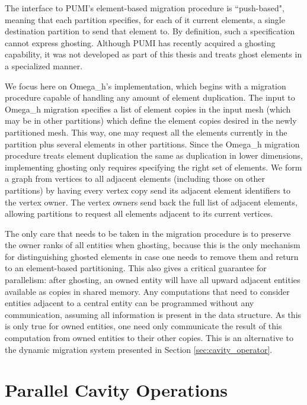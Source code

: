 The interface to PUMI's element-based migration procedure is
``push-based", meaning that each partition specifies, for each
of it current elements, a single destination partition to send
that element to.
By definition, such a specification cannot express ghosting.
Although PUMI has recently acquired a ghosting capability, it was
not developed as part of this thesis and treats ghost elements
in a specialized manner.

We focus here on Omega\_h's implementation, which begins with
a migration procedure capable of handling any amount of element duplication.
The input to Omega\_h migration specifies a list of element copies
in the input mesh (which may be in other partitions) which define
the element copies desired in the newly partitioned mesh.
This way, one may request all the elements currently in the
partition plus several elements in other partitions.
Since the Omega\_h migration procedure treats element duplication
the same as duplication in lower dimensions, implementing ghosting
only requires specifying the right set of elements.
We form a graph from vertices to all adjacent elements (including
those on other partitions) by having every vertex copy send its
adjacent element identifiers to the vertex owner.
The vertex owners send back the full list of adjacent elements,
allowing partitions to request all elements adjacent to its current
vertices.

The only care that needs to be taken in the migration procedure
is to preserve the owner ranks of all entities when ghosting,
because this is the only mechanism for distinguishing ghosted
elements in case one needs to remove them and return to
an element-based partitioning.
This also gives a critical guarantee for parallelism:
after ghosting, an owned entity will have all upward adjacent
entities available as copies in shared memory.
Any computations that need to consider entities adjacent to
a central entity can be programmed without any communication,
assuming all information is present in the data structure.
As this is only true for owned entities, one need only communicate
the result of this computation from owned entities to their other
copies.
This is an alternative to the dynamic migration system
presented in Section \ref{sec:cavity_operator}.

\section{Parallel Cavity Operations}
\label{sec:cavity_sched}

